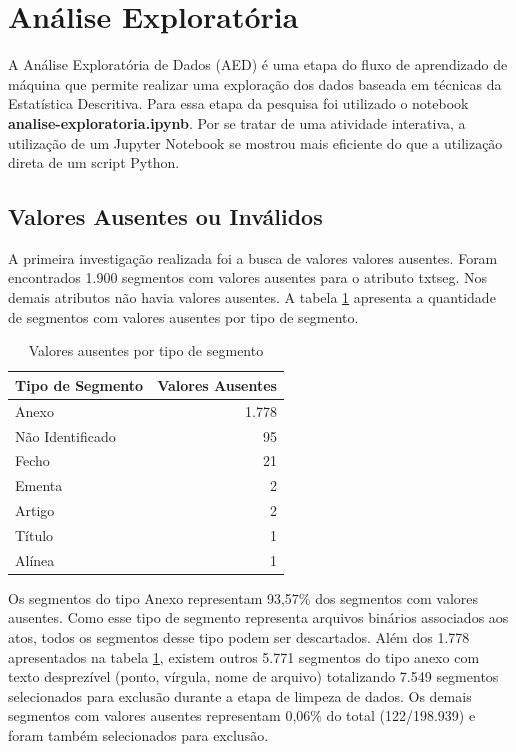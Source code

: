 \section{Análise Exploratória}

A Análise Exploratória de Dados (AED) é uma etapa do fluxo de aprendizado de máquina que permite realizar uma exploração dos dados baseada em técnicas da Estatística Descritiva. Para essa etapa da pesquisa foi utilizado o notebook \textbf{analise-exploratoria.ipynb}. Por se tratar de uma atividade interativa, a utilização de um Jupyter Notebook se mostrou mais eficiente do que a utilização direta de um script Python.

\subsection{Valores Ausentes ou Inválidos}

A primeira investigação realizada foi a busca de valores valores ausentes. Foram encontrados 1.900 segmentos com valores ausentes para o atributo txt\textunderscore seg. Nos demais atributos não havia valores ausentes. A tabela \ref{tab:valores-ausentes} apresenta a quantidade de segmentos com valores ausentes por tipo de segmento.

\begin{table}[h] 
\caption{Valores ausentes por tipo de segmento}
\label{tab:valores-ausentes}
	\begin{center} 
		\begin{tabular}{lr} 
			\toprule			
			Tipo de Segmento & Valores Ausentes \\
			\midrule
			Anexo & 1.778 \\
			Não Identificado & 95 \\			
			Fecho & 21 \\
			Ementa & 2 \\			
			Artigo & 2 \\
			Título & 1 \\
			Alínea & 1 \\			
			\bottomrule
		\end{tabular}
	\end{center}
	\fdp
\end{table} 

Os segmentos do tipo Anexo representam 93,57\% dos segmentos com valores ausentes. Como esse tipo de segmento representa arquivos binários associados aos atos, todos os segmentos desse tipo podem ser descartados. Além dos 1.778 apresentados na tabela \ref{tab:valores-ausentes}, existem outros 5.771 segmentos do tipo anexo com texto desprezível (ponto, vírgula, nome de arquivo) totalizando 7.549 segmentos selecionados para exclusão durante a etapa de limpeza de dados. Os demais segmentos com valores ausentes representam 0,06\% do total (122/198.939) e foram também selecionados para exclusão.

